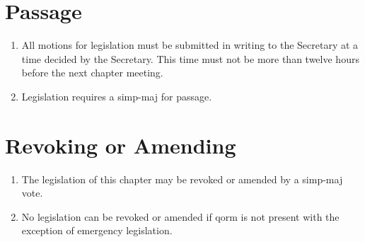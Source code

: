 	\section{Passage}
		\begin{enumerate}
			\item All motions for legislation must be submitted in writing to the Secretary at a time decided by the Secretary. This time must not be more than twelve hours before the next chapter meeting. \label{legislation-time}

			\item Legislation requires a \gls{simp-maj} for passage. 

		\end{enumerate}

	\section{Revoking or Amending}
		\begin{enumerate}
			\item The legislation of this chapter may be revoked or amended by a \gls{simp-maj} vote.
			\item No legislation can be revoked or amended if \gls{qorm} is not present with the exception of emergency legislation.

		\end{enumerate}


